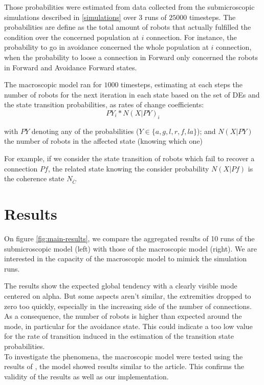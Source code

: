 \documentclass[a4paper, 10pt, conference]{ieeeconf}
\begin{document}
  Those probabilities were estimated from data collected from the submicroscopic simulations described in \ref{simulations} over 3 runs of $25 000$ timesteps. The probabilities are define as the total amount of robots that actually fulfilled the condition over the concerned population at $i$ connection. For instance, the probability to go in avoidance concerned the whole population at $i$ connection, when the probability to loose a connection in Forward only concerned the robots in Forward and Avoidance Forward states.

  The macroscopic model ran for $1000$ timesteps, estimating at each steps the number of robots for the next iteration in each state based on the set of DEs and the state transition probabilities, as rates of change coefficients:
  \[
    PY_i * N(X|PY)_i
  \]

  with $PY$ denoting any of the probabilities ($Y \in \{a, g, l, r, f, la\}$); and $N(X|PY)$ the number of robots in the affected state (knowing which one)

  For example, if we consider the state transition of robots which fail to recover a connection $Pf$, the related state knowing the consider probability $N(X|Pf)$ is the coherence state $N_{\bar C}$


\section{Results}
  On figure \ref{fig:main-results}, we compare the aggregated results of 10 runs of the submicroscopic model (left) with those of the macroscopic model (right). We are interested in the capacity of the macroscopic model to mimick the simulation runs.

  The results show the expected global tendency with a clearly visible mode centered on alpha. But some aspects aren't similar, the extremities dropped to zero too quickly, especially in the increasing side of the number of connections. As a consequence, the number of robots is higher than expected around the mode, in particular for the avoidance state. This could indicate a too low value for the rate of transition induced in the estimation of the transition state probabilities.\\

  To investigate the phenomena, the macroscopic model were tested using the results of \cite{Winfield08}, the model showed results similar to the article. This confirms the validity of the results as well as our implementation.
\end{document}
